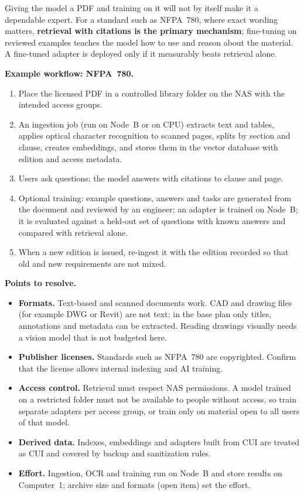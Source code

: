 Giving the model a PDF and training on it will not by itself make it a dependable
expert. For a standard such as NFPA~780, where exact wording matters, \textbf{retrieval
with citations is the primary mechanism}; fine-tuning on reviewed examples teaches the
model how to use and reason about the material. A fine-tuned adapter is deployed only
if it measurably beats retrieval alone.

\textbf{Example workflow: NFPA~780.}
\begin{enumerate}
  \item Place the licensed PDF in a controlled library folder on the NAS with the intended
    access groups.
  \item An ingestion job (run on Node~B or on CPU) extracts text and tables, applies optical
    character recognition to scanned pages, splits by section and clause, creates
    embeddings, and stores them in the vector database with edition and access metadata.
  \item Users ask questions; the model answers with citations to clause and page.
  \item Optional training: example questions, answers and tasks are generated from the
    document and reviewed by an engineer; an adapter is trained on Node~B; it is evaluated
    against a held-out set of questions with known answers and compared with retrieval alone.
  \item When a new edition is issued, re-ingest it with the edition recorded so that old and
    new requirements are not mixed.
\end{enumerate}

\textbf{Points to resolve.}
\begin{itemize}
  \item \textbf{Formats.} Text-based and scanned documents work. CAD and drawing files (for
    example DWG or Revit) are not text; in the base plan only titles, annotations and
    metadata can be extracted. Reading drawings visually needs a vision model that is not
    budgeted here.
  \item \textbf{Publisher licenses.} Standards such as NFPA~780 are copyrighted. Confirm that
    the license allows internal indexing and AI training.
  \item \textbf{Access control.} Retrieval must respect NAS permissions. A model trained on a
    restricted folder must not be available to people without access, so train separate
    adapters per access group, or train only on material open to all users of that model.
  \item \textbf{Derived data.} Indexes, embeddings and adapters built from CUI are treated as
    CUI and covered by backup and sanitization rules.
  \item \textbf{Effort.} Ingestion, OCR and training run on Node~B and store results on
    Computer~1; archive size and formats (open item) set the effort.
\end{itemize}

